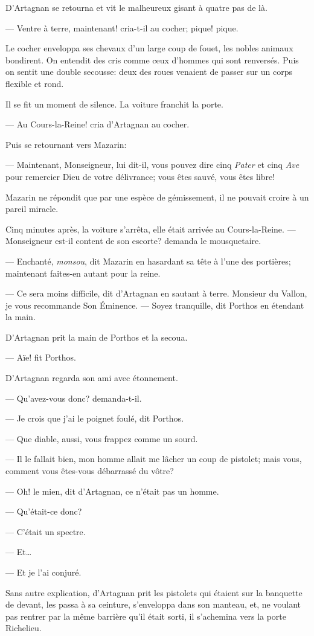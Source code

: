 D'Artagnan se retourna et vit le malheureux gisant à quatre pas de là.

— Ventre à terre, maintenant! cria-t-il au cocher; pique! pique.

Le cocher enveloppa ses chevaux d'un large coup de fouet, les nobles animaux bondirent. On entendit des cris comme ceux d'hommes qui sont renversés. Puis on sentit une double secousse: deux des roues venaient de passer sur un corps flexible et rond.

Il se fit un moment de silence. La voiture franchit la porte.

— Au Cours-la-Reine! cria d'Artagnan au cocher.

Puis se retournant vers Mazarin:

— Maintenant, Monseigneur, lui dit-il, vous pouvez dire cinq \textit{Pater} et cinq \textit{Ave} pour remercier Dieu de votre délivrance; vous êtes sauvé, vous êtes libre!

Mazarin ne répondit que par une espèce de gémissement, il ne pouvait croire à un pareil miracle.

Cinq minutes après, la voiture s'arrêta, elle était arrivée au Cours-la-Reine.
— Monseigneur est-il content de son escorte? demanda le mousquetaire.

— Enchanté, \textit{monsou}, dit Mazarin en hasardant sa tête à l'une des portières; maintenant faites-en autant pour la reine.

— Ce sera moins difficile, dit d'Artagnan en sautant à terre. Monsieur du Vallon, je vous recommande Son Éminence.
— Soyez tranquille, dit Porthos en étendant la main.

D'Artagnan prit la main de Porthos et la secoua.

— Aïe! fit Porthos.

D'Artagnan regarda son ami avec étonnement.

— Qu'avez-vous donc? demanda-t-il.

— Je crois que j'ai le poignet foulé, dit Porthos.

— Que diable, aussi, vous frappez comme un sourd.

— Il le fallait bien, mon homme allait me lâcher un coup de pistolet; mais vous, comment vous êtes-vous débarrassé du vôtre?

— Oh! le mien, dit d'Artagnan, ce n'était pas un homme.

— Qu'était-ce donc?

— C'était un spectre.

— Et\dots

— Et je l'ai conjuré.

Sans autre explication, d'Artagnan prit les pistolets qui étaient sur la banquette de devant, les passa à sa ceinture, s'enveloppa dans son manteau, et, ne voulant pas rentrer par la même barrière qu'il était sorti, il s'achemina vers la porte Richelieu.